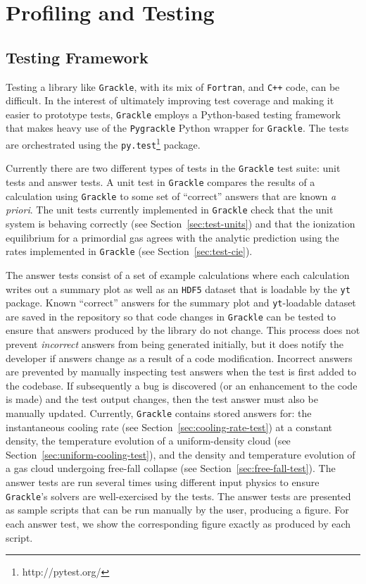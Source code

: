 \section{Profiling and Testing}
\label{sec:profiling-and-testing}



\subsection{Testing Framework}
\label{sec:testing}

Testing a library like \texttt{Grackle}, with its mix of \texttt{Fortran}, and
\texttt{C++} code, can be difficult. In the interest of ultimately improving
test coverage and making it easier to prototype tests, \texttt{Grackle} employs a
Python-based testing framework that makes heavy use of the \texttt{Pygrackle}
Python wrapper for \texttt{Grackle}. The tests are orchestrated using the
\texttt{py.test}\footnote{http://pytest.org/} package.

Currently there are two different types of tests in the \texttt{Grackle} test suite: unit
tests and answer tests. A unit test in \texttt{Grackle} compares the results of a
calculation using \texttt{Grackle} to some set of ``correct'' answers that are known
\textit{a priori}. The unit tests currently implemented in \texttt{Grackle} check that the
unit system is behaving correctly (see Section~\ref{sec:test-units}) and that the
ionization equilibrium for a primordial gas agrees with the analytic prediction
using the rates implemented in \texttt{Grackle} (see Section~\ref{sec:test-cie}).

The answer tests consist of a set of example calculations where each calculation
writes out a summary plot as well as an \texttt{HDF5} dataset that is loadable
by the \texttt{yt} package. Known ``correct'' answers for the summary plot and
\texttt{yt}-loadable dataset are saved in the repository so that code changes in
\texttt{Grackle} can be tested to ensure that answers produced by the library do not
change. This process does not prevent \textit{incorrect} answers from being
generated initially, but it does notify the developer if answers change
as a result of a code modification. Incorrect answers are prevented by manually inspecting test
answers when the test is first added to the codebase. If subsequently a bug is
discovered (or an enhancement to the code is made) and the test output changes, then the test answer must also be
manually updated. Currently, \texttt{Grackle} contains stored answers for: the
instantaneous cooling rate (see Section~\ref{sec:cooling-rate-test})
at a constant density, the temperature evolution of a uniform-density cloud (see
Section~\ref{sec:uniform-cooling-test}), and the density and
temperature evolution of a gas cloud undergoing free-fall collapse
(see Section~\ref{sec:free-fall-test}). The answer tests are run
several times using different input physics to ensure \texttt{Grackle}'s
solvers are well-exercised by the tests.  The answer tests are
presented as sample scripts that can be run manually by the user,
producing a figure.  For each answer test, we show the corresponding
figure exactly as produced by each script.

